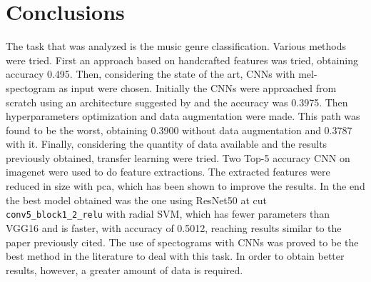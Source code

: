 \section{Conclusions}
The task that was analyzed is the music genre classification.
Various methods were tried.
First an approach based on handcrafted features was tried, obtaining accuracy 0.495.
Then, considering the state of the art, CNNs with mel-spectogram as input were chosen. 
Initially the CNNs were approached from scratch using an architecture suggested by \cite{kostrzewa2021music} and the accuracy was 0.3975. 
Then hyperparameters optimization and data augmentation were made. 
This path was found to be the worst, obtaining 0.3900 without data augmentation and 0.3787 with it.
Finally, considering the quantity of data available and the results previously obtained, transfer learning were tried.
Two Top-5 accuracy CNN on imagenet were used to do feature extractions.
The extracted features were reduced in size with pca, which has been shown to improve the results.
In the end the best model obtained was the one using ResNet50 at cut \texttt{conv5\_block1\_2\_relu} with radial SVM, which has fewer parameters than VGG16 and is faster, with accuracy of 0.5012, reaching results similar to the paper previously cited.
The use of spectograms with CNNs was proved to be the best method in the literature to deal with this task.
In order to obtain better results, however, a greater amount of data is required.
